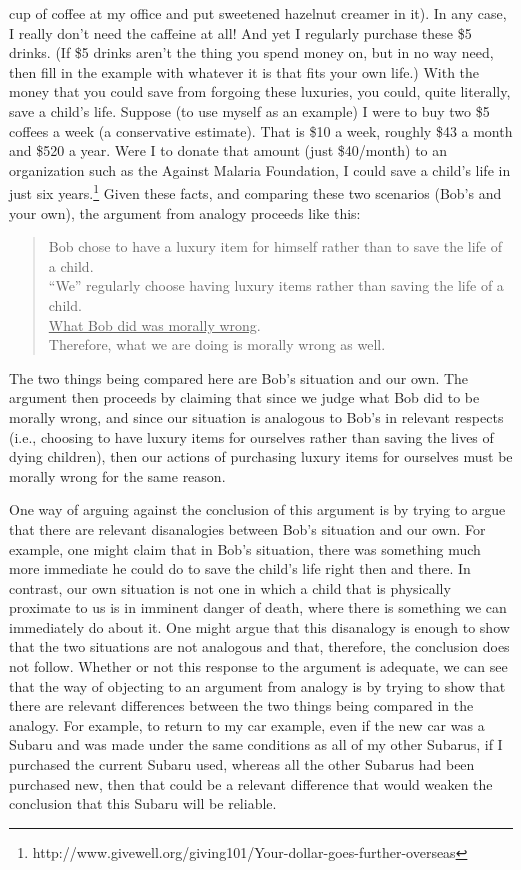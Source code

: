 cup of coffee at my office and put sweetened hazelnut creamer in it). In any
case, I really don't need the caffeine at all! And yet I regularly purchase these \$5
drinks. (If \$5 drinks aren't the thing you spend money on, but in no way need,
then fill in the example with whatever it is that fits your own life.) With the
money that you could save from forgoing these luxuries, you could, quite
literally, save a child's life. Suppose (to use myself as an example) I were to buy
two \$5 coffees a week (a conservative estimate). That is \$10 a week, roughly
\$43 a month and \$520 a year. Were I to donate that amount (just \$40/month) to
an organization such as the Against Malaria Foundation, I could save a child's
life in just six 
years.\footnote{http://www.givewell.org/giving101/Your-dollar-goes-further-overseas}
Given these facts, and comparing these two scenarios
(Bob's and your own), the argument from analogy proceeds like this:

\begin{quote}
Bob chose to have a luxury item for himself rather than to save the life
of a child. \\
``We'' regularly choose having luxury items rather than saving the life
of a child. \\
\underline{What Bob did was morally wrong}. \\
Therefore, what we are doing is morally wrong as well. \\
\end{quote}

The two things being compared here are Bob's situation and our own. The
argument then proceeds by claiming that since we judge what Bob did to be
morally wrong, and since our situation is analogous to Bob's in relevant respects
(i.e., choosing to have luxury items for ourselves rather than saving the lives of
dying children), then our actions of purchasing luxury items for ourselves must
be morally wrong for the same reason.

One way of arguing against the conclusion of this argument is by trying to argue
that there are relevant disanalogies between Bob's situation and our own. For
example, one might claim that in Bob's situation, there was something much
more immediate he could do to save the child's life right then and there. In
contrast, our own situation is not one in which a child that is physically proximate
to us is in imminent danger of death, where there is something we can
immediately do about it. One might argue that this disanalogy is enough to
show that the two situations are not analogous and that, therefore, the
conclusion does not follow. Whether or not this response to the argument is
adequate, we can see that the way of objecting to an argument from analogy is
by trying to show that there are relevant differences between the two things
being compared in the analogy. For example, to return to my car example,
even if the new car was a Subaru and was made under the same conditions as all
of my other Subarus, if I purchased the current Subaru used, whereas all the
other Subarus had been purchased new, then that could be a relevant difference
that would weaken the conclusion that this Subaru will be reliable.

